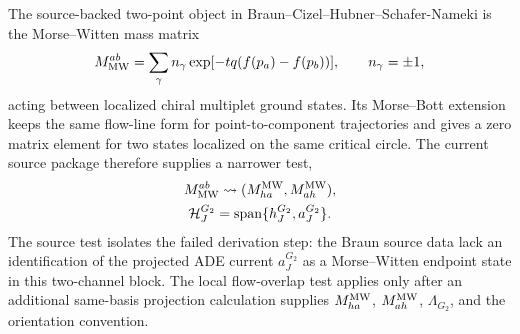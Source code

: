 The source-backed two-point object in Braun--Cizel--Hubner--Schafer-Nameki is
the Morse--Witten mass matrix
\begin{equation}
  M_{\rm MW}^{ab}
  =
  \sum_\gamma n_\gamma
  \exp[-tq(f(p_a)-f(p_b))],
  \qquad
  n_\gamma=\pm1,
  \label{eq:g2-braun-morse-witten-matrix}
\end{equation}
acting between localized chiral multiplet ground states.  Its Morse--Bott
extension keeps the same flow-line form for point-to-component trajectories and
gives a zero matrix element for two states localized on the same critical
circle.  The current source package therefore supplies a narrower test,
\begin{equation}
  \begin{gathered}
  M_{\rm MW}^{ab}
  \leadsto
  (M_{ha}^{\rm MW},M_{ah}^{\rm MW}),\\
  \mathcal H_J^{G_2}=\operatorname{span}\{h_J^{G_2},a_J^{G_2}\}.
  \end{gathered}
  \label{eq:g2-mw-to-ha-test}
\end{equation}
The source test isolates the failed derivation step: the Braun source data lack an
identification of the projected ADE current \(a_J^{G_2}\) as a
Morse--Witten endpoint state in this two-channel block.  The local flow-overlap
test applies only after an additional same-basis projection calculation supplies
\(M_{ha}^{\rm MW}\), \(M_{ah}^{\rm MW}\), \(\Lambda_{G_2}\), and the
orientation convention.

